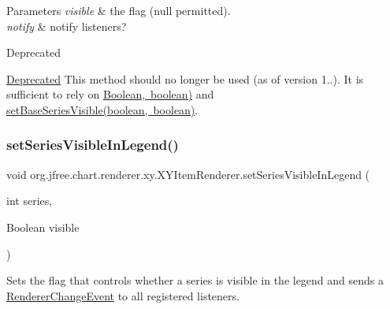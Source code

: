 \begin{DoxyParams}{Parameters}
{\em visible} & the flag ({\ttfamily null} permitted). \\
\hline
{\em notify} & notify listeners?\\
\hline
\end{DoxyParams}
\begin{DoxyRefDesc}{Deprecated}
\item[\mbox{\hyperlink{deprecated__deprecated000215}{Deprecated}}]This method should no longer be used (as of version 1..). It is sufficient to rely on \mbox{\hyperlink{}{Boolean, boolean)}} and \mbox{\hyperlink{interfaceorg_1_1jfree_1_1chart_1_1renderer_1_1xy_1_1_x_y_item_renderer_aba42a9e2002f1602b4ae35029adc6181}{set\+Base\+Series\+Visible(boolean, boolean)}}. \end{DoxyRefDesc}
\mbox{\label{interfaceorg_1_1jfree_1_1chart_1_1renderer_1_1xy_1_1_x_y_item_renderer_a2f4070365d96adda597ae686d9b195db}} 
\subsubsection{\texorpdfstring{set\+Series\+Visible\+In\+Legend()}{setSeriesVisibleInLegend()}\hspace{0.1cm}{\footnotesize\ttfamily [1/4]}}
{\footnotesize\ttfamily void org.\+jfree.\+chart.\+renderer.\+xy.\+X\+Y\+Item\+Renderer.\+set\+Series\+Visible\+In\+Legend (\begin{DoxyParamCaption}\item[{int}]{series,  }\item[{Boolean}]{visible }\end{DoxyParamCaption})}

Sets the flag that controls whether a series is visible in the legend and sends a \mbox{\hyperlink{}{Renderer\+Change\+Event}} to all registered listeners.


